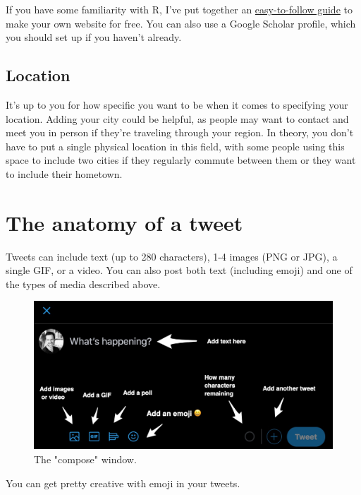 \documentclass[
]{book}
\begin{document}
If you have some familiarity with R, I've put together an \href{https://www.dsquintana.blog/free-website-in-r-easy/}{easy-to-follow guide} to make your own website for free. You can also use a Google Scholar profile, which you should set up if you haven't already.

\hypertarget{location}{%
\subsection{Location}\label{location}}

It's up to you for how specific you want to be when it comes to specifying your location. Adding your city could be helpful, as people may want to contact and meet you in person if they're traveling through your region. In theory, you don't have to put a single physical location in this field, with some people using this space to include two cities if they regularly commute between them or they want to include their hometown.

\hypertarget{the-anatomy-of-a-tweet}{%
\section*{The anatomy of a tweet}\label{the-anatomy-of-a-tweet}}

Tweets can include text (up to 280 characters), 1-4 images (PNG or JPG), a single GIF, or a video. You can also post both text (including emoji) and one of the types of media described above.

\begin{figure}

\includegraphics[width=0.8\linewidth]{images/compose} \hfill{}

\caption{The "compose" window.}\label{fig:unnamed-chunk-5}
\end{figure}

You can get pretty creative with emoji in your tweets.
\end{document}
